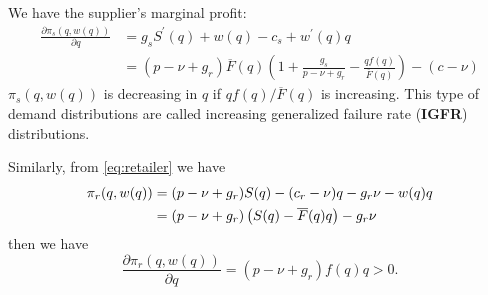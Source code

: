 We have the supplier's marginal profit:
\begin{align*}
    \frac{\partial\pi_s(q,w(q))}{\partial q}&=g_s S^\prime(q)+w(q)-c_s+w^\prime(q)q\\
    &=(p-\nu+g_r)\overline{F}(q)\left(1+\frac{g_s}{p-\nu+g_r}-\frac{q f(q)}{\overline{F}(q)}\right)-(c-\nu)
\end{align*}
$\pi_s(q,w(q))$ is decreasing in $q$ if $qf(q)/\overline{F}(q)$ is increasing. This type of demand distributions are called increasing generalized failure rate (\textbf{IGFR}) distributions.

Similarly, from \ref{eq:retailer} we have 
\begin{align*}
    \pi_r(q,w(q))&=(p-\nu+g_r)S(q)-(c_r-\nu)q-g_r\nu-w(q)q\\
    &=(p-\nu+g_r)\left(S(q)-\overline{F}(q) q\right)-g_r\nu
\end{align*}
then we have 
\begin{equation*}
    \frac{\partial\pi_r(q,w(q))}{\partial q}=(p-\nu+g_r)f(q)q>0.
\end{equation*}
